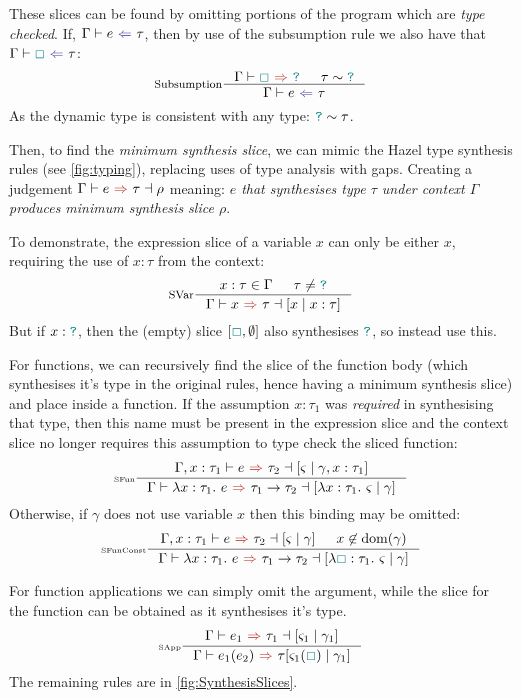 These slices can be found by omitting portions of the program which are \textit{type checked}. If, $\analysis{e}{\tau}$, then by use of the subsumption rule we also have that $\analysis{\gap}{\tau}$:
\[\inference[Subsumption]{\synthesis{\gap}{\dyn} & \tau \sim \dyn}{\analysis{e}{\tau}}\] 
As the dynamic type is consistent with any type: ${\color{teal}\texttt{?}} \sim \tau$.

Then, to find the \textit{minimum synthesis slice}, we can mimic the Hazel type synthesis rules (see \cref{fig:typing}), replacing uses of type analysis with gaps. Creating a judgement $\synthesisslice{e}{\tau}{\rho}$ meaning: \textit{$e$ that synthesises type $\tau$ under context $\Gamma$ produces minimum synthesis slice $\rho$}.

To demonstrate, the expression slice of a variable $x$ can only be either $x$, requiring the use of $x : \tau$ from the context:
\[
\inference[SVar]{x : \tau \in \Gamma & \tau \neq \dyn}{\synthesisslice{x}{\tau}{[x\mid x:\tau]}}\]
But if $x : {\color{teal}\texttt{?}}$, then the (empty) slice $[{\color{teal}\Box}, \emptyset]$ also synthesises ${\color{teal}\texttt{?}}$, so instead use this. 

For functions, we can recursively find the slice of the function body (which synthesises it's type in the original rules, hence having a minimum synthesis slice) and place inside a function. 
If the assumption $x : \tau_1$ was \textit{required} in synthesising that type, then this name must be present in the expression slice and the context slice no longer requires this assumption to type check the sliced function:
\[\inference[\tiny SFun]{\synthesisslice[\Gamma,x:\tau_1]{e}{\tau_2}{[\varsigma \mid \gamma, x : \tau_1]} }{\synthesisslice{\lambda x:\tau_1.\ e}{\tau_1 \to \tau_2}{[\lambda x : \tau_1.\ \varsigma \mid \gamma]}}\]
Otherwise, if $\gamma$ does not use variable $x$ then this binding may be omitted:
\[\inference[\tiny SFunConst]{\synthesisslice[\Gamma,x:\tau_1]{e}{\tau_2}{[\varsigma \mid \gamma]} & x \not \in \mathrm{dom}(\gamma)}{\synthesisslice{\lambda x:\tau_1.\ e}{\tau_1 \to \tau_2}{[\lambda \gap : \tau_1.\ \varsigma \mid \gamma]}}\]

For function applications we can simply omit the argument, while the slice for the function can be obtained as it synthesises it's type.
\[\inference[\tiny SApp]{\synthesisslice{e_1}{\tau_1}{[\varsigma_1 \mid \gamma_1]}}{\synthesis{e_1(e_2)}{\tau}{[\varsigma_1(\gap) \mid \gamma_1]}}\]
The remaining rules are in \cref{fig:SynthesisSlices}.


